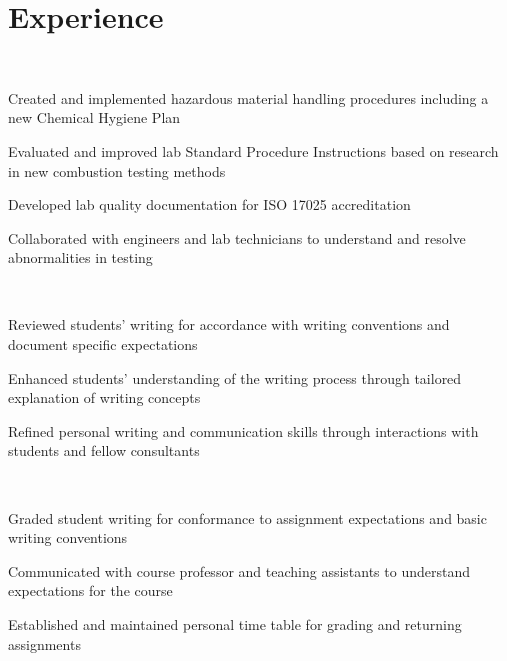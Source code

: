 \documentclass[]{deedy-resume-openfont}
\begin{document}
\begin{minipage}[t]{0.66\textwidth} 


\section{Experience}
\sectionsep
{} \\
\vspace{\topsep} %
\begin{tightemize}
	\item Created and implemented hazardous material handling procedures including a new Chemical Hygiene Plan
	\item Evaluated and improved lab Standard Procedure Instructions based on research in new combustion testing methods 
	\item Developed lab quality documentation for ISO 17025 accreditation
	\item Collaborated with engineers and lab technicians to understand and resolve abnormalities in testing
\end{tightemize}
\sectionsep

 \\
\begin{tightemize}
	\item Reviewed students' writing for accordance with writing conventions and document specific expectations
	\item Enhanced students' understanding of the writing process through tailored explanation of writing concepts
	\item Refined personal writing and communication skills through interactions with students and fellow consultants
\end{tightemize}
\sectionsep

 \\
\begin{tightemize}
	\item Graded student writing for conformance to assignment expectations and basic writing conventions
	\item Communicated with course professor and teaching assistants to understand expectations for the course
	\item Established and maintained personal time table for grading and returning assignments
\end{tightemize}
\sectionsep


\end{minipage}
\end{document}
